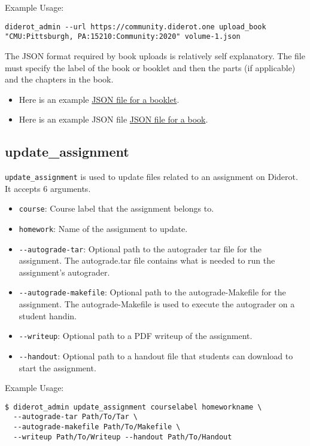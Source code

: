 Example Usage:
\begin{verbatim}
diderot_admin --url https://community.diderot.one upload_book  "CMU:Pittsburgh, PA:15210:Community:2020" volume-1.json
\end{verbatim}
 
\begin{gram}
The JSON format required by book uploads is relatively self explanatory.
The file must specify the label of the book or booklet and then the parts (if applicable) and the chapters in the book. 
%
\begin{itemize}
\item Here is an example 
\href{file://cli/attachments/booklet-example.json}
{JSON file for a booklet}.
\item Here is an example JSON file 
\href{file://cli/attachment/book-example.json}
{JSON file for a book}.
\end{itemize}
\end{gram}



\subsection{update\_assignment}

\verb|update_assignment| is used to update files related to an assignment on Diderot.
%
It accepts 6 arguments.

\begin{itemize}
  \item \verb|course|: Course label that the assignment belongs to.
  \item \verb|homework|: Name of the assignment to update.
  \item \verb|--autograde-tar|: Optional path to the autograder tar file for the assignment. The autograde.tar file contains what is needed to run the assignment's autograder.
  \item \verb|--autograde-makefile|: Optional path to the autograde-Makefile for the assignment. The autograde-Makefile is used to execute the autograder on a student handin.
  \item \verb|--writeup|: Optional path to a PDF writeup of the assignment.
  \item \verb|--handout|: Optional path to a handout file that students can download to start the assignment.
\end{itemize}

Example Usage:
\begin{verbatim}
$ diderot_admin update_assignment courselabel homeworkname \
  --autograde-tar Path/To/Tar \
  --autograde-makefile Path/To/Makefile \
  --writeup Path/To/Writeup --handout Path/To/Handout
\end{verbatim}
